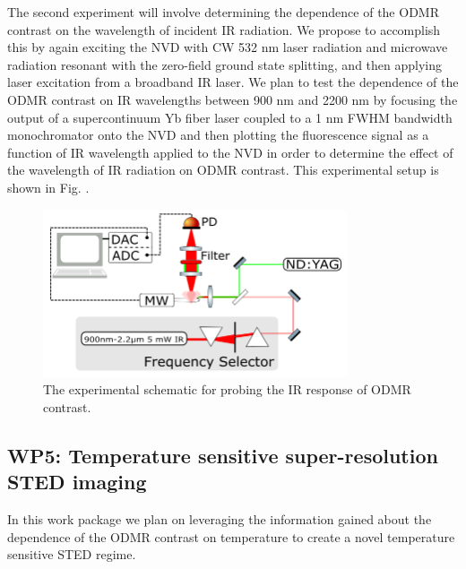 The second experiment will involve determining the dependence of the ODMR contrast on the wavelength of incident
IR radiation.  We propose to accomplish this by again exciting the NVD with CW 532 nm laser radiation and
microwave radiation resonant with the zero-field ground state splitting, and then applying laser excitation from
a broadband IR laser.  We plan to test the dependence of the ODMR contrast on IR wavelengths between 900 nm and
2200 nm by focusing the output of a supercontinuum Yb fiber laser coupled to a 1 nm FWHM bandwidth monochromator
onto the NVD and then plotting the fluorescence signal as a function of IR wavelength applied to the NVD in 
order to determine the effect of the wavelength of IR radiation on ODMR contrast. This experimental setup is 
shown in Fig. \label{WP4IRSchematic}.

\begin{figure}
\centering
\includegraphics[width=0.8\textwidth]{Figures/WP4IRSchematic.png}
\caption{The experimental schematic for probing the IR response of ODMR contrast.}
\label{WP4IRrSchematic}
\end{figure}

\subsection{WP5: Temperature sensitive super-resolution STED imaging}
In this work package we plan on leveraging the information gained about the dependence of the ODMR contrast on 
temperature to create a novel temperature sensitive STED regime.

